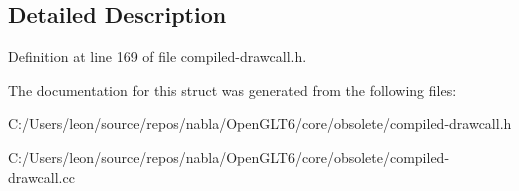 \subsection{Detailed Description}


Definition at line 169 of file compiled-\/drawcall.\+h.



The documentation for this struct was generated from the following files\+:\begin{DoxyCompactItemize}
\item 
C\+:/\+Users/leon/source/repos/nabla/\+Open\+G\+L\+T6/core/obsolete/compiled-\/drawcall.\+h\item 
C\+:/\+Users/leon/source/repos/nabla/\+Open\+G\+L\+T6/core/obsolete/compiled-\/drawcall.\+cc\end{DoxyCompactItemize}
